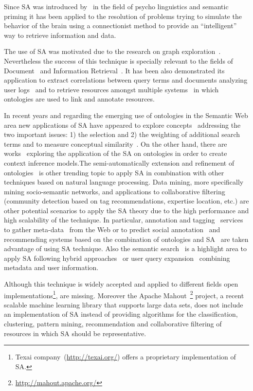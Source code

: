 Since SA was introduced by~\cite{Collins_Loftus_1975} in the field of 
psycho linguistics and semantic priming it has been applied to the resolution
of problems trying to simulate the behavior of the brain using a connectionist method
to provide an ``intelligent'' way to retrieve information and data. 

The use of SA was motivated due to the research on graph exploration~\cite{Scott1981,AndersonTheory}. Nevertheless
the success of this technique is specially relevant to the fields of Document~\cite{turtle91inference} 
and Information Retrieval~\cite{Cohen1987}. It has
been also demonstrated its application to extract correlations between query terms and documents analyzing user 
logs~\cite{Cui03} and to retrieve resources amongst multiple systems~\cite{Schumacher+2008search} 
in which ontologies are used to link and annotate resources.

In recent years and regarding the emerging use of ontologies in the Semantic Web area new applications of SA have
appeared to explore concepts~\cite{Qiu93,Chen95} addressing the two important issues: 1) the selection and 2) the weighting of
additional search terms and to measure conceptual similarity~\cite{gouws-vanrooyen-engelbrecht:2010:CCSR}. 
On the other hand, there are works~\cite{DBLP:journals/cogsr/KatiforiVD10} 
exploring the application of the SA on ontologies in order to create context inference models.The 
semi-automatically extension and refinement of ontologies~\cite{liu_et_al_2005} is other trending topic to apply SA
in combination with other techniques based on natural language processing. Data mining,
more specifically mining socio-semantic networks\cite{paper:troussov:2008}, and applications 
to collaborative filtering (community detection based on tag recommendations, expertise location, etc.) are other 
potential scenarios to apply the SA theory due to the high performance and high scalability of the technique. In particular, 
annotation and tagging~\cite{labraTagging2007} services to gather meta-data~\cite{GelgiVD05} from the Web or to predict social annotation~\cite{Chen:2007:PSA:1780653.1780702} and recommending 
systems based on the combination of ontologies and SA~\cite{citeulike:3779904} are taken advantage of using SA technique. 
Also the semantic search~\cite{conf-sofsem-Suchal08} is a highlight area to apply SA following
hybrid approaches~\cite{bopaEstonia,RochaSA04} or user query expansion~\cite{767402} combining metadata 
and user information.

Although this technique is widely accepted and applied to different fields open implementations\footnote{ 
Texai company~(\url{http://texai.org/}) offers a proprietary implementation of SA.}, are missing. Moreover 
the Apache Mahout~\footnote{\url{http://mahout.apache.org/}} project, a recent scalable machine learning library 
that supports large data sets, does not include an implementation of SA instead of 
providing algorithms for the classification, clustering, pattern mining, 
recommendation and collaborative filtering of resources in which SA should be representative. 
 


